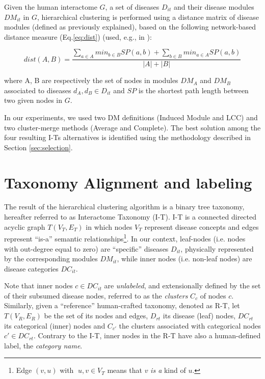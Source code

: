 \documentclass[journal,twoside,web]{ieeecolor}
\begin{document}
Given the human interactome $G$, a set of diseases $D_{it}$ and their disease modules $DM_{it}$ in $G$, hierarchical clustering is performed using a distance matrix of  disease modules  (defined as previously explained), based on the following network-based distance measure (Eq.\eqref{eq:dist})  (used, e.g., in \cite{menche2015uncovering, booknetwork, cheng2018network}):

\begin{footnotesize}
\begin{equation}
dist(A,B) = \frac{\sum_{a \in A}min_{b \in B}SP(a,b) +  \sum_{b \in B}min_{a \in A}SP(a,b)}{|A|+|B|}
\label{eq:dist}
\end{equation}
\end{footnotesize}

\noindent where A, B are respectively the set of nodes in modules $DM_A$ and $DM_B$ associated to diseases $d_{A}, d_{B} \in D_{it}$ and $SP$ is the shortest path length between two given nodes in  $G$.

In our experiments, we used two DM definitions (Induced Module and LCC)  and two cluster-merge methods (Average and Complete). The best solution among the four resulting I-Ts alternatives is identified using the methodology described in  Section \ref{sec:selection}.
 
\section{Taxonomy Alignment and labeling}
\label{sec:alignmentlabelling}
The result of the hierarchical clustering algorithm is a binary tree taxonomy, hereafter referred to as Interactome Taxonomy (I-T). I-T is a connected directed acyclic graph $T(V_{T}, E_{T})$ in which nodes $V_{T}$ represent disease concepts and edges represent ``is-a'' semantic relationships\footnote{Edge $(v, u)$ with $\;u, v \in V_{T}$ means that $v$ \textit{is a} kind of $u$.}. In our context, leaf-nodes (i.e. nodes with out-degree equal to zero) are ``specific'' diseases $D_{it}$, physically represented by the corresponding modules $DM_{it}$, while  inner nodes (i.e. non-leaf nodes) are disease categories $DC_{it}$.

Note that inner nodes $c \in DC_{it}$ are \textit{unlabeled}, and extensionally defined by the set of their subsumed disease nodes, 
referred to as the \textit{clusters} $C_c$ of nodes $c$. 
Similarly, given a ``reference'' human-crafted taxonomy, denoted as R-T, let $T(V_{R}, E_{R})$  be the set of its nodes and edges, $D_{rt}$  its disease (leaf) nodes, $DC_{rt}$ its  categorical (inner) nodes and $C_{c'}$  the clusters associated with categorical nodes $c' \in DC_{rt}$. Contrary to the I-T,  inner nodes in the R-T have also a human-defined label, the \textit{category name}.
\vspace{-9pt}
\end{document}
